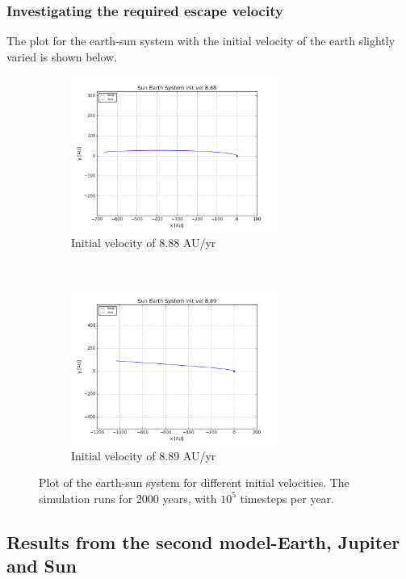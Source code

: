 \documentclass[a4paper, 10pt]{article}
\begin{document}
\subsubsection{Investigating the required escape velocity}
The plot for the earth-sun system with the initial velocity of the earth slightly varied is shown below.
\begin{figure}[t!]
    \centering
    \begin{subfigure}[t]{0.5\textwidth}
        \centering
        \includegraphics[height=2.0in]{escape888.png}
        \caption{Initial velocity of 8.88 AU/yr}
    \end{subfigure}%
    ~ 
    \begin{subfigure}[t]{0.5\textwidth}
        \centering
        \includegraphics[height=2.0in]{escape889.png}
        \caption{Initial velocity of 8.89 AU/yr}
    \end{subfigure}
    \caption{Plot of the earth-sun system for different initial velocities. The simulation runs for 2000 years, with $10^5$ timesteps per year.}\label{fig:escape_vel}
\end{figure}

\subsection{Results from the second model-Earth, Jupiter and Sun}
\end{document}
